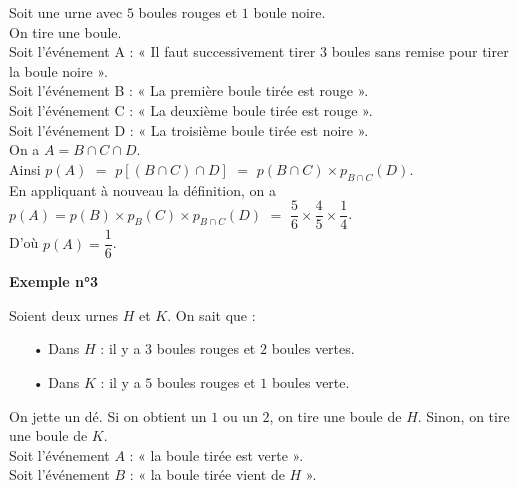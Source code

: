 Soit une urne avec $5$ boules rouges et $1$ boule noire. \\ On tire une boule. \\

Soit l'événement A : « Il faut successivement tirer $3$ boules sans remise pour tirer la boule noire ». \\
Soit l'événement B : « La première boule tirée est rouge ». \\
Soit l'événement C : « La deuxième boule tirée est rouge ». \\
Soit l'événement D : « La troisième boule tirée est noire ». \\

On a $A = B \cap C \cap D$. \\

Ainsi $p\left(A\right)$ $=$ $p\left[\left(B\cap C\right) \cap D\right]$ $=$ $p\left(B \cap C\right) \times p_{B \cap C}\left(D\right)$. \vspace*{.3cm} \\

En appliquant à nouveau la définition, on a $p\left(A\right) = p\left(B\right) \times p_B\left(C\right) \times p_{B\cap C}\left(D\right)$ $=$ $\dfrac{5}{6} \times \dfrac{4}{5} \times \dfrac{1}{4}$. \vspace*{.3cm} \\

D'où $p\left(A\right) = \dfrac{1}{6}$. 

\vspace*{-5cm}

\newpage

\vspace*{-1.5cm}

\textbf{Exemple n°3} 

Soient deux urnes $H$ et $K$. On sait que : \\

\begin{itemize}
\item[•] Dans $H$ : il y a $3$ boules rouges et $2$ boules vertes. 
\item[•] Dans $K$ : il y a $5$ boules rouges et $1$ boules verte. 
\end{itemize}

\vspace*{.3cm}

On jette un dé. Si on obtient un $1$ ou un $2$, on tire une boule de $H$. Sinon, on tire une boule de $K$. \\

Soit l'événement $A$ : « la boule tirée est verte ». \\
Soit l'événement $B$ : « la boule tirée vient de $H$ ». \\

